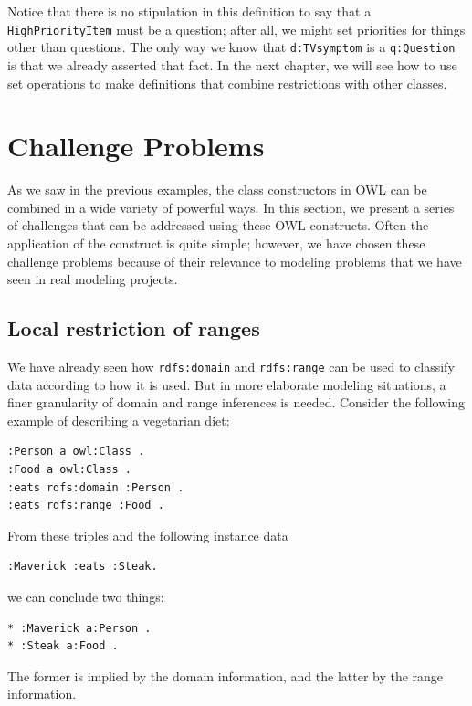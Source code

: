Notice that there is no stipulation in this definition to say that a
\texttt{HighPriorityItem} must be a question; after all, we might set priorities
for things other than questions. The only way we know that \texttt{d:TVsymptom}
is a \texttt{q:Question} is that we already asserted that fact. In the next
chapter, we will see how to use set operations to make definitions that
combine restrictions with other classes.

\section{Challenge Problems}

As we saw in the previous examples, the class constructors in OWL can be
combined in a wide variety of powerful ways. In this section, we present
a series of challenges that can be addressed using these OWL constructs.
Often the application of the construct is quite simple; however, we have
chosen these challenge problems because of their relevance to modeling
problems that we have seen in real modeling projects.

\subsection{Local restriction of ranges}

We have already seen how \texttt{rdfs:domain} and \texttt{rdfs:range} can be used to
classify data according to how it is used. But in more elaborate
modeling situations, a finer granularity of domain and range inferences
is needed. Consider the following example of describing a vegetarian
diet:

\begin{lstlisting}
:Person a owl:Class .
:Food a owl:Class .
:eats rdfs:domain :Person .
:eats rdfs:range :Food .
\end{lstlisting}

From these triples and the following instance data

\begin{lstlisting}
:Maverick :eats :Steak.
\end{lstlisting}

we can conclude two things:

\begin{lstlisting}
* :Maverick a:Person .
* :Steak a:Food .
\end{lstlisting}

The former is implied by the domain information, and the latter by the
range information.

